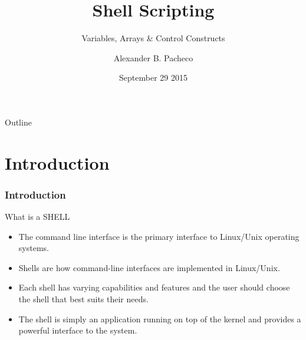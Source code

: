\documentclass[10pt,t]{beamer}
\title{Shell Scripting}
\subtitle{Variables, Arrays \& Control Constructs}
\author{Alexander B. Pacheco}
\institute{\href{http://researchcomputing.lehigh.edu}{LTS Research Computing}}%
\date{September 29 2015}%
\begin{document}
\begin{frame}
  \titlepage
\end{frame}

\footnotesize
\begin{frame}{Outline}
  \tableofcontents
\end{frame}

\section{Introduction}
\begin{frame}[label=day1]
  \frametitle{Introduction}
  \begin{exampleblock}{What is a SHELL}
    \begin{itemize}
      \item The command line interface is the primary interface to Linux/Unix operating systems.
      \item Shells are how command-line interfaces are implemented in Linux/Unix.
      \item Each shell has varying capabilities and features and the user should choose the shell that best suits their needs.
      \item The shell is simply an application running on top of the kernel and provides a powerful interface to the system.
    \end{itemize}
  \end{exampleblock}
\end{frame}
\end{document}
